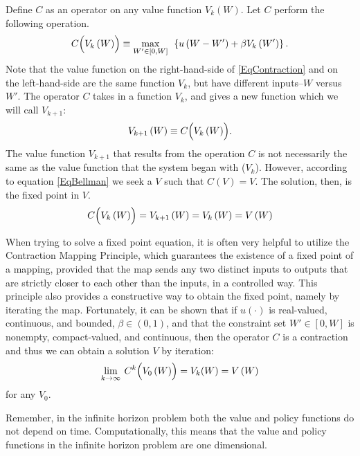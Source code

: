 Define $C$ as an operator on any value function $V_k\left(W\right)$. Let $C$ perform the following operation.
\begin{equation}
\label{EqContraction}
C\Bigl(V_k\left(W\right)\Bigr) \equiv \max_{W'\in[0,W]}\:\: \left\{u\left(W-W'\right) + \beta V_k\left(W'\right)\right\}.
\end{equation}
Note that the value function on the right-hand-side of \eqref{EqContraction} and on the left-hand-side are the same function $V_k$,
but have different inputs--$W$ versus $W'$. The operator $C$ takes in a function $V_k$, and gives a new
function which we will call $V_{k+1}$:
\begin{equation*}
V_{k+1}\left(W\right) \equiv C\Bigl(V_k\left(W\right)\Bigr).
\end{equation*}
The value function $V_{k+1}$ that results from the operation $C$ is not necessarily the same as the value function that the system
began with ($V_k$). However, according to equation \eqref{EqBellman} we seek a $V$ such that $C(V) = V$.  The solution, then, is the fixed point in $V$.
\begin{equation*}
C\Bigl(V_k\left(W\right)\Bigr) = V_{k+1}\left(W\right) = V_k\left(W\right) = V\left(W\right)
\end{equation*}

When trying to solve a fixed point equation, it is often very helpful to utilize the Contraction Mapping Principle, which
guarantees the existence of a fixed point of a mapping, provided that the map sends any two distinct inputs to outputs
that are strictly closer to each other than the inputs, in a controlled way. This principle also provides a constructive
way to obtain the fixed point, namely by iterating the map.
Fortunately, it can be shown that if $u(\cdot)$ is real-valued, continuous, and bounded, $\beta\in(0,1)$, and that the constraint
set $W'\in[0,W]$ is nonempty, compact-valued, and continuous, then the operator $C$ is a contraction and thus we can obtain
a solution $V$ by iteration:
\begin{equation*}
\lim_{k\rightarrow\infty}\: C^k\Bigl(V_0\left(W\right)\Bigr) = V_k(W) =  V\left(W\right)
\end{equation*}
for any $V_0$.

Remember, in the infinite horizon problem both the value and policy functions do not depend on time.  Computationally, this means that
 the value and policy functions in the infinite horizon problem are one dimensional.

